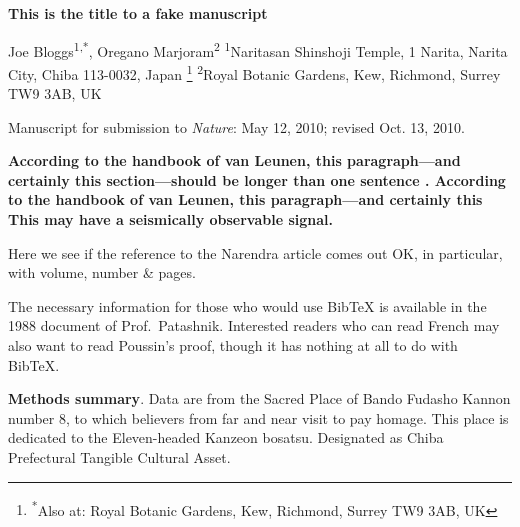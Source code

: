 \documentclass[12pt,a4paper]{article}
\begin{document}
{\noindent\bf This is the title to a fake manuscript}

{\raggedright\noindent Joe Bloggs\textsuperscript{1,*},
Oregano Marjoram\textsuperscript{2}
\vskip 10pt\noindent%
\hfil\break
%
\textsuperscript{1}Naritasan Shinshoji Temple, 1 Narita, Narita City, Chiba
113-0032, Japan
\footnote{%
\textsuperscript{*}Also at:
Royal Botanic Gardens, Kew, Richmond, Surrey TW9 3AB, UK
}
\vskip 5pt\noindent%
%
\textsuperscript{2}Royal Botanic Gardens, Kew, Richmond, Surrey TW9 3AB, UK

\vskip 5pt\noindent%

Manuscript for submission to {\em Nature}: May 12, 2010; revised Oct. 13, 2010.
\vskip 10pt\noindent
\doublespacing }

{\bf 
According to the handbook of van Leunen\citep{Birch1952, Stevenson1981},
this paragraph---and certainly this
section---should be longer than one sentence
\citep{FearnLoper1981}.
According to the handbook of van Leunen, this paragraph---and certainly this
This may have a seismically observable signal.
}

Here we see if the reference\citep{Stevenson1981, Woodetal2006}
to the Narendra article comes out OK, in particular,
with volume, number \& pages.

The necessary information for those who would use BibTeX
is available in the 1988 document of Prof.\ Patashnik\citep{Rubieetal2004,
Ozawaetal2008,
Frostetal2010,
HiltyCrafts1952}.
Interested readers who can read French may also
want to read Poussin's proof\citep{LayYoung1990,
Garneroetal1993,
Tanaka2007,
AlexandrakisEaton2010},
though it has nothing at all to do with BibTeX.

\bigskip\noindent
{\bf Methods summary}.
Data are from the Sacred Place of Bando Fudasho Kannon number 8, to which
believers from far and near visit to pay homage.
This place is dedicated to the Eleven-headed Kanzeon bosatsu.
Designated as Chiba Prefectural Tangible Cultural Asset.
\end{document}
